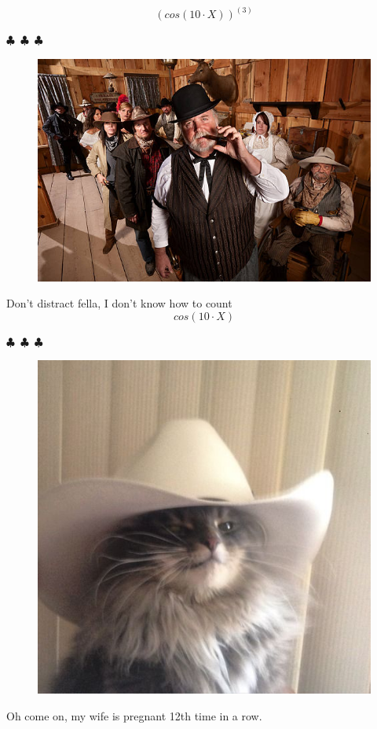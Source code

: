 \documentclass{article}
\begin{document}
\begin{equation}
{{({cos{({{10}\cdot{X}})}})}^{({3})}}
\end{equation}
\begin{center} $\clubsuit$~$\clubsuit$~$\clubsuit$ \end{center}\begin{figure}[H] \includegraphics[scale=1.4]{funny_pics/funny_bartender.jpg} \end{figure} Don't distract fella, I don't know how to count
\begin{equation}
{cos{({{10}\cdot{X}})}}
\end{equation}
\begin{center} $\clubsuit$~$\clubsuit$~$\clubsuit$ \end{center}\begin{figure}[H] \includegraphics[scale=0.3]{funny_pics/cowboy_cat.jpg} \end{figure}Oh come on, my wife is pregnant 12th time in a row.
\end{document}
